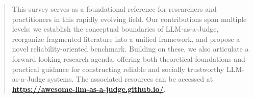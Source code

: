 \documentclass[acmsmall,screen]{acmart}
\begin{document}
\begin{abstract}
This survey serves as a foundational reference for researchers and practitioners in this rapidly evolving field. Our contributions span multiple levels: we establish the conceptual boundaries of LLM-as-a-Judge, reorganize fragmented literature into a unified framework, and propose a novel reliability-oriented benchmark. Building on these, we also articulate a forward-looking research agenda, offering both theoretical foundations and practical guidance for constructing reliable and socially trustworthy LLM-as-a-Judge systems.
The associated resources can be accessed at \textbf{\url{https://awesome-llm-as-a-judge.github.io/}}.
\end{abstract}






\end{document}
